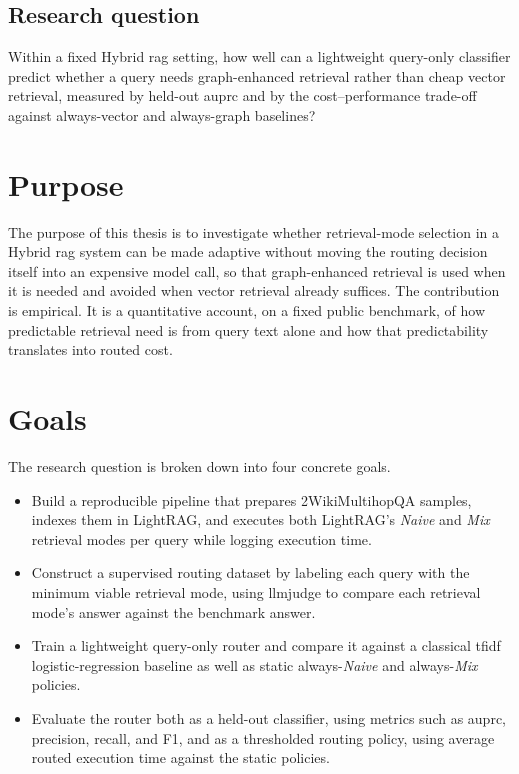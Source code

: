 \documentclass[english, bibtex]{kththesis}               %
\numberwithin{listing}{chapter}
\begin{document}
\subsection{Research question}
\label{sec:researchQuestion}

Within a fixed Hybrid \gls{rag} setting, how well can a lightweight query-only classifier predict whether a query needs graph-enhanced retrieval rather than cheap vector retrieval, measured by held-out \gls{auprc} and by the cost--performance trade-off against always-vector and always-graph baselines?

\section{Purpose}
\label{sec:purpose}

The purpose of this thesis is to investigate whether retrieval-mode selection in a Hybrid \gls{rag} system can be made adaptive without moving the routing decision itself into an expensive model call, so that graph-enhanced retrieval is used when it is needed and avoided when vector retrieval already suffices. The contribution is empirical. It is a quantitative account, on a fixed public benchmark, of how predictable retrieval need is from query text alone and how that predictability translates into routed cost.

\section{Goals}
\label{sec:goals}

The research question is broken down into four concrete goals.

\begin{itemize}
    \item Build a reproducible pipeline that prepares 2WikiMultihopQA samples, indexes them in LightRAG, and executes both LightRAG's \emph{Naive} and \emph{Mix} retrieval modes per query while logging execution time.
    \item Construct a supervised routing dataset by labeling each query with the minimum viable retrieval mode, using \gls{llmjudge} to compare each retrieval mode's answer against the benchmark answer.
    \item Train a lightweight query-only router and compare it against a classical \gls{tfidf} logistic-regression baseline as well as static always-\emph{Naive} and always-\emph{Mix} policies.
    \item Evaluate the router both as a held-out classifier, using metrics such as \gls{auprc}, precision, recall, and F1, and as a thresholded routing policy, using average routed execution time against the static policies.
\end{itemize}
\end{document}
